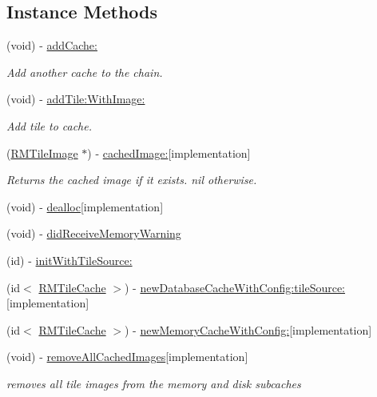 \subsection*{Instance Methods}
\begin{DoxyCompactItemize}
\item 
(void) -\/ \hyperlink{interface_r_m_tile_cache_a9cbc6208e3a22e2ddbf8087fe7573ad4}{add\-Cache\-:}
\begin{DoxyCompactList}\small\item\em Add another cache to the chain. \end{DoxyCompactList}\item 
(void) -\/ \hyperlink{interface_r_m_tile_cache_a6ce63fa534992f6ee7c15df022af6c1d}{add\-Tile\-:\-With\-Image\-:}
\begin{DoxyCompactList}\small\item\em Add tile to cache. \end{DoxyCompactList}\item 
(\hyperlink{interface_r_m_tile_image}{R\-M\-Tile\-Image} $\ast$) -\/ \hyperlink{interface_r_m_tile_cache_a2997933774f64c368496428207fa07d2}{cached\-Image\-:}{\ttfamily  \mbox{[}implementation\mbox{]}}
\begin{DoxyCompactList}\small\item\em Returns the cached image if it exists. nil otherwise. \end{DoxyCompactList}\item 
(void) -\/ \hyperlink{interface_r_m_tile_cache_aeeae4c7b1c77f838257f6beb61bb2a7a}{dealloc}{\ttfamily  \mbox{[}implementation\mbox{]}}
\item 
(void) -\/ \hyperlink{interface_r_m_tile_cache_acae4cd4977b12707593939ec33d10dc6}{did\-Receive\-Memory\-Warning}
\item 
(id) -\/ \hyperlink{interface_r_m_tile_cache_ad98dd8c66c48285943c6cf61bf9b9cb9}{init\-With\-Tile\-Source\-:}
\item 
(id$<$ \hyperlink{interface_r_m_tile_cache}{R\-M\-Tile\-Cache} $>$) -\/ \hyperlink{interface_r_m_tile_cache_a0fed814002237dc293bc9fc134dfc142}{new\-Database\-Cache\-With\-Config\-:tile\-Source\-:}{\ttfamily  \mbox{[}implementation\mbox{]}}
\item 
(id$<$ \hyperlink{interface_r_m_tile_cache}{R\-M\-Tile\-Cache} $>$) -\/ \hyperlink{interface_r_m_tile_cache_a1d899346330d2b6cd99962edf1bb33d6}{new\-Memory\-Cache\-With\-Config\-:}{\ttfamily  \mbox{[}implementation\mbox{]}}
\item 
(void) -\/ \hyperlink{interface_r_m_tile_cache_ab28006a890a193dbf7efec6b31ceda0f}{remove\-All\-Cached\-Images}{\ttfamily  \mbox{[}implementation\mbox{]}}
\begin{DoxyCompactList}\small\item\em removes all tile images from the memory and disk subcaches \end{DoxyCompactList}\end{DoxyCompactItemize}
